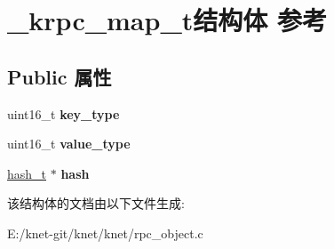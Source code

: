 \hypertarget{struct__krpc__map__t}{}\section{\+\_\+krpc\+\_\+map\+\_\+t结构体 参考}
\label{struct__krpc__map__t}
\subsection*{Public 属性}
\begin{DoxyCompactItemize}
\item 
\hypertarget{struct__krpc__map__t_ac15cc07012dd09c3148595a58e7044c8}{}uint16\+\_\+t {\bfseries key\+\_\+type}\label{struct__krpc__map__t_ac15cc07012dd09c3148595a58e7044c8}

\item 
\hypertarget{struct__krpc__map__t_acc4c0879bedc13cb9b4e2f3695905810}{}uint16\+\_\+t {\bfseries value\+\_\+type}\label{struct__krpc__map__t_acc4c0879bedc13cb9b4e2f3695905810}

\item 
\hypertarget{struct__krpc__map__t_aed4e46fb2ad26a88c6e03d666c1170f7}{}\hyperlink{struct__hash__t}{hash\+\_\+t} $\ast$ {\bfseries hash}\label{struct__krpc__map__t_aed4e46fb2ad26a88c6e03d666c1170f7}

\end{DoxyCompactItemize}


该结构体的文档由以下文件生成\+:\begin{DoxyCompactItemize}
\item 
E\+:/knet-\/git/knet/knet/rpc\+\_\+object.\+c\end{DoxyCompactItemize}

